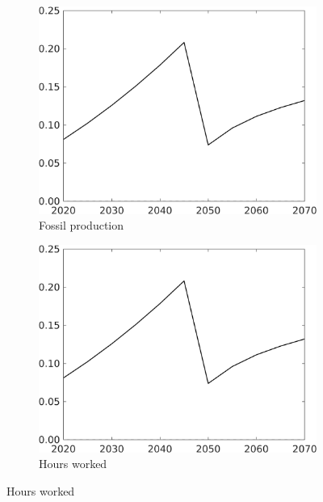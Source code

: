 \begin{figure}[h!!!]
\begin{subfigure}{0.4\textwidth}
\end{subfigure}
	\begin{subfigure}{0.4\textwidth}
		\caption{Fossil production}
		\includegraphics[width=1\textwidth]{../../codding_model/own_basedOnFried/optimalPol_010922_revision/figures/all_13Sept22_Tplus30/CountTAUFPerDif_Opt_target_F_nsk1_xgr0_knspil0_regime4_spillover0_sep0_extern0_PV1_etaa0.79.png}
	\end{subfigure}	
	\begin{subfigure}{0.4\textwidth}
		\caption{Hours worked}
		\includegraphics[width=1\textwidth]{../../codding_model/own_basedOnFried/optimalPol_010922_revision/figures/all_13Sept22_Tplus30/CountTAUFPerDif_Opt_target_hh_nsk1_xgr0_knspil0_regime4_spillover0_sep0_extern0_PV1_etaa0.79.png}

\end{subfigure}
\end{figure}

